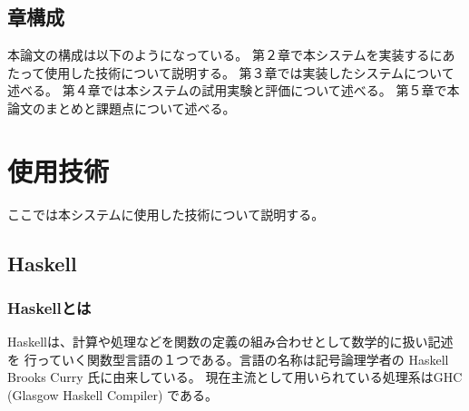 \documentclass{csspaper}
\begin{document}
      \section{章構成}
      本論文の構成は以下のようになっている。
      第２章で本システムを実装するにあたって使用した技術について説明する。
      第３章では実装したシステムについて述べる。
      第４章では本システムの試用実験と評価について述べる。
      第５章で本論文のまとめと課題点について述べる。

   \chapter{使用技術}
   ここでは本システムに使用した技術について説明する。

   \section{Haskell}
      \subsection{Haskellとは}
      Haskellは、計算や処理などを関数の定義の組み合わせとして数学的に扱い記述を
      行っていく関数型言語の１つである。言語の名称は記号論理学者の
      Haskell Brooks Curry 氏に由来している。
      現在主流として用いられている処理系はGHC (Glasgow Haskell Compiler) である。
\end{document}

